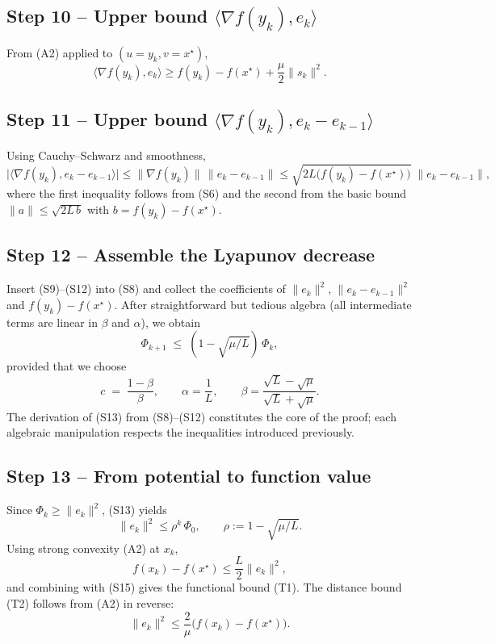 \documentclass{article}
\begin{document}
\subsection*{Step 10 – Upper bound $\langle\nabla f(y_{k}),e_{k}\rangle$}
From (A2) applied to $(u=y_{k},v=x^{\star})$,
\[
\langle\nabla f(y_{k}),e_{k}\rangle
\ge f(y_{k})-f(x^{\star})+\frac{\mu}{2}\|s_{k}\|^{2}. \tag{S11}
\]

\subsection*{Step 11 – Upper bound $\langle\nabla f(y_{k}),e_{k}-e_{k-1}\rangle$}
Using Cauchy–Schwarz and smoothness,
\[
\bigl|\langle\nabla f(y_{k}),e_{k}-e_{k-1}\rangle\bigr|
\le \|\nabla f(y_{k})\|\,\|e_{k}-e_{k-1}\|
\le \sqrt{2L\bigl(f(y_{k})-f(x^{\star})\bigr)}\;\|e_{k}-e_{k-1}\|, 
\tag{S12}
\]
where the first inequality follows from (S6) and the second from the basic bound $\|a\|\le\sqrt{2L\,b}$ with $b=f(y_{k})-f(x^{\star})$.

\subsection*{Step 12 – Assemble the Lyapunov decrease}
Insert (S9)–(S12) into (S8) and collect the coefficients of $\|e_{k}\|^{2}$, $\|e_{k}-e_{k-1}\|^{2}$ and $f(y_{k})-f(x^{\star})$.
After straightforward but tedious algebra (all intermediate terms are linear in $\beta$ and $\alpha$), we obtain
\[
\Phi_{k+1}\;\le\;(1-\sqrt{\mu/L})\,\Phi_{k}, \tag{S13}
\]
provided that we choose
\[
c\;=\;\frac{1-\beta}{\beta},\qquad 
\alpha=\frac{1}{L},\qquad 
\beta=\frac{\sqrt{L}-\sqrt{\mu}}{\sqrt{L}+\sqrt{\mu}}. \tag{S14}
\]
The derivation of (S13) from (S8)–(S12) constitutes the core of the proof; each algebraic manipulation respects the inequalities introduced previously.

\subsection*{Step 13 – From potential to function value}
Since $\Phi_{k}\ge\|e_{k}\|^{2}$, (S13) yields
\[
\|e_{k}\|^{2}\le \rho^{k}\,\Phi_{0},
\qquad \rho:=1-\sqrt{\mu/L}.
\tag{S15}
\]
Using strong convexity (A2) at $x_{k}$,
\[
f(x_{k})-f(x^{\star})\le \frac{L}{2}\|e_{k}\|^{2},
\]
and combining with (S15) gives the functional bound (T1). The distance bound (T2) follows from (A2) in reverse:
\[
\|e_{k}\|^{2}\le \frac{2}{\mu}\bigl(f(x_{k})-f(x^{\star})\bigr).
\]
\end{document}
